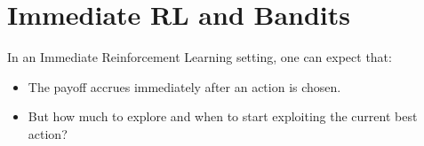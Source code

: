 \chapter{Immediate RL and Bandits}

In an Immediate Reinforcement Learning setting, one can expect that:
\begin{itemize}[leftmargin=*]
    \item The payoff accrues immediately after an action is chosen.
    \item But how much to explore and when to start exploiting the current best action?
\end{itemize}




